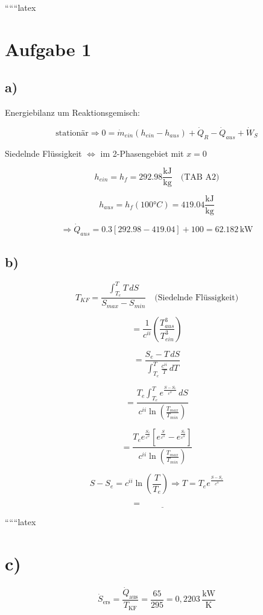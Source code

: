 
``````latex


\section*{Aufgabe 1}

\subsection*{a)}

Energiebilanz um Reaktionsgemisch:

\[
\text{stationär} \Rightarrow 0 = \dot{m}_{ein} \left( h_{ein} - h_{aus} \right) + \dot{Q}_R - \dot{Q}_{aus} + \dot{W}_S
\]

Siedelnde Flüssigkeit \(\Leftrightarrow\) im 2-Phasengebiet mit \(x = 0\)

\[
h_{ein} = h_f = 292.98 \frac{\text{kJ}}{\text{kg}} \quad \text{(TAB A2)}
\]

\[
h_{aus} = h_f(100°C) = 419.04 \frac{\text{kJ}}{\text{kg}}
\]

\[
\Rightarrow \dot{Q}_{aus} = 0.3 \left[ 292.98 - 419.04 \right] + 100 = 62.182 \, \text{kW}
\]

\subsection*{b)}

\[
T_{KF} = \frac{\int_{T_e}^{T} T \, dS}{S_{max} - S_{min}} \quad \text{(Siedelnde Flüssigkeit)}
\]

\[
= \frac{1}{c^{ii}} \left( \frac{T_{aus}^3}{T_{ein}^3} \right)
\]

\[
= \frac{S_e - T \, dS}{\int_{T_e}^{T} \frac{c^{ii}}{T} \, dT}
\]

\[
= \frac{T_e \int_{T_e}^{T} e^{\frac{S - S_e}{c^{ii}}} \, dS}{c^{ii} \ln \left( \frac{T_{max}}{T_{min}} \right)}
\]

\[
= \frac{T_e e^{\frac{S_e}{c^{ii}}} \left[ e^{\frac{S}{c^{ii}}} - e^{\frac{S_e}{c^{ii}}} \right]}{c^{ii} \ln \left( \frac{T_{max}}{T_{min}} \right)}
\]

\[
S - S_e = c^{ii} \ln \left( \frac{T}{T_e} \right) \Rightarrow T = T_e e^{\frac{S - S_e}{c^{ii}}}
\]

\[
= \underline{\hspace{2cm}}
\]

``````latex


\section*{c)}
\[
\dot{S}_{\text{ers}} = \frac{\dot{Q}_{\text{aus}}}{T_{\text{KF}}} = \frac{65}{295} = 0{,}2203 \, \frac{\text{kW}}{\text{K}}
\]

